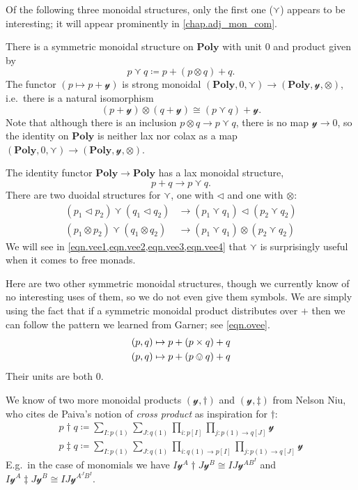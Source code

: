 \documentclass[11pt, one side, article]{memoir}
\theoremstyle{definition}
\theoremstyle{plain}
\newcommand{\Cat}[1]{\mathbf{#1}}%
\newcommand{\yon}{\mathcal{y}}
\newcommand{\poly}{\Cat{Poly}}
\newcommand{\0}{\textsf{0}}
\newcommand{\1}{\tn{\textsf{1}}}
\newcommand{\tri}{\mathbin{\triangleleft}}
\begin{document}
Of the following three monoidal structures, only the first one ($\curlyvee$) appears to be interesting; it will appear prominently in \cref{chap.adj_mon_com}.

There is a symmetric monoidal structure on $\poly$ with unit $0$ and product given by
\begin{equation}\label{eqn.vee}
  p\curlyvee q\coloneqq p+(p\otimes q)+q.
\end{equation}
The functor $(p\mapsto p+\yon)$ is strong monoidal $(\poly,0,\curlyvee)\to(\poly,\yon,\otimes)$, i.e.\ there is a natural isomorphism
\begin{equation}
	(p+\yon)\otimes(q+\yon)\cong (p\curlyvee q)+\yon.
\end{equation}
Note that although there is an inclusion $p\otimes q\to p\curlyvee q$, there is no map $\yon\to0$, so the identity on $\poly$ is neither lax nor colax as a map $(\poly,0,\curlyvee)\to(\poly,\yon,\otimes)$.

The identity functor $\poly\to\poly$ has a lax monoidal structure,
\begin{equation}
	p+q\to p\curlyvee q.
\end{equation}
There are two duoidal structures for $\curlyvee$, one with $\tri$ and one with $\otimes$:
\begin{align*}
	(p_1\tri p_2)\curlyvee(q_1\tri q_2)&\to(p_1\curlyvee q_1)\tri(p_2\curlyvee q_2)\\
	(p_1\otimes p_2)\curlyvee(q_1\otimes q_2)&\to(p_1\curlyvee q_1)\otimes(p_2\curlyvee q_2)
\end{align*}
We will see in \cref{eqn.vee1,eqn.vee2,eqn.vee3,eqn.vee4} that $\curlyvee$ is surprisingly useful when it comes to free monads.

Here are two other symmetric monoidal structures, though we currently know of no interesting uses of them, so we do not even give them symbols. We are simply using the fact that if a symmetric monoidal product distributes over $+$ then we can follow the pattern we learned from Garner; see \eqref{eqn.ovee}.
\begin{align}
	(p,q)&\mapsto p+(p\times q)+q\\
	(p,q)&\mapsto p+(p\ovee q)+q
\end{align}
Their units are both $0$. 

We know of two more monoidal products $(\yon,\dagger)$ and $(\yon, \ddagger)$ from Nelson Niu, who cites de Paiva's notion of \emph{cross product} as inspiration for $\dagger$:
\begin{align}
	p\dagger q\coloneqq\sum_{I: p(1)}\sum_{J: q(1)}\prod_{i: p[I]}\prod_{j\colon p(1)\to q[J]}\yon\\
	p\ddagger q\coloneqq\sum_{I: p(1)}\sum_{J: q(1)}\prod_{i\colon q(1)\to p[I]}\prod_{j\colon p(1)\to q[J]}\yon
\end{align}
E.g.\ in the case of monomials we have $I\yon^A\dagger J\yon^B\cong IJ\yon^{AB^I}$ and $I\yon^A\ddagger J\yon^B\cong IJ\yon^{A^JB^I}$.
\end{document}
